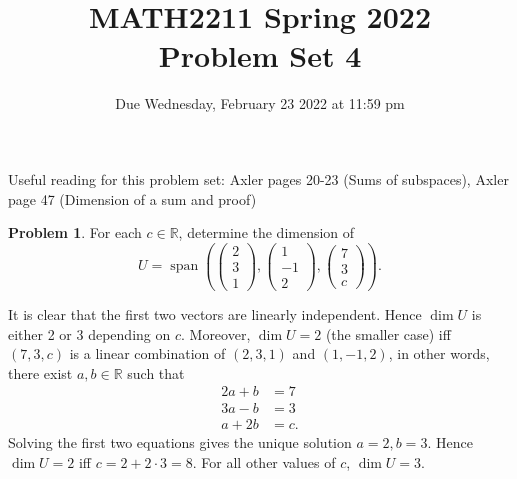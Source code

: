 \documentclass[11pt,oneside]{amsart}
\title{MATH2211 Spring 2022\\
Problem Set 4}
\author{Due Wednesday, February 23 2022 at 11:59 pm}
\theoremstyle{definition}
\newtheorem{problem}{Problem}
\newcommand{\bR}{\mathbb{R}}
\newcommand*\dcolvec[1]{\begin{pmatrix}#1\end{pmatrix}}
\DeclareMathOperator{\Span}{span}
\begin{document}
    \maketitle

    Useful reading for this problem set: Axler pages 20-23 (Sums of subspaces), Axler page 47 (Dimension of a sum and proof)

    \begin{problem}
        For each $c\in\bR$, determine the dimension of
        \[U=\Span\left( \dcolvec{2\\3\\1},\dcolvec{1\\-1\\2},\dcolvec{7\\3\\c} \right).\]
    \end{problem}
    \begin{solution}
        It is clear that the first two vectors are linearly independent. Hence $\dim U$ is either 2 or 3 depending on $c$. Moreover, $\dim U=2$ (the smaller case) iff $(7,3,c)$ is a linear combination of $(2,3,1)$ and $(1,-1,2)$, in other words, there exist $a,b\in\bR$ such that
        \begin{align*}
            2a+b &= 7\\
            3a-b &= 3\\
            a+2b &= c.
        \end{align*}
        Solving the first two equations gives the unique solution $a=2,b=3$. Hence $\dim U=2$ iff $c=2+2\cdot 3=8$. For all other values of $c$, $\dim U=3$.
    \end{solution}
\end{document}
